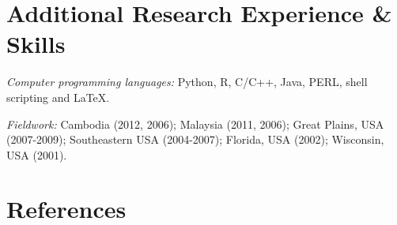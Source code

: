 \section*{Additional Research Experience \& Skills}
\myHangIndent
{\sffamily\itshape Computer programming languages:} Python, R, C/C++, Java,
PERL, shell scripting and \LaTeX.

\myHangIndent
{\sffamily\itshape Fieldwork:} Cambodia (2012, 2006); Malaysia (2011, 2006);
Great Plains, USA (2007-2009); Southeastern USA (2004-2007); Florida, USA
(2002); Wisconsin, USA (2001).

\section*{References}



